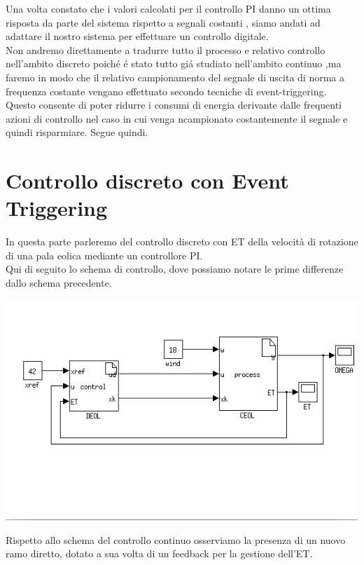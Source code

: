 \documentclass[a4paper,13pt]{article}
\begin{document}
Una volta constato che i valori calcolati per il controllo PI danno un ottima risposta 
da parte del sistema rispetto a segnali costanti , siamo andati ad adattare il nostro sistema per effettuare un controllo digitale.\\
Non andremo direttamente a tradurre tutto il processo e relativo controllo nell'ambito discreto 
poich\'e \'e stato tutto gi\'a studiato nell'ambito continuo ,ma faremo in modo che il relativo campionamento del segnale di uscita di norma a frequenza costante vengano effettuato secondo tecniche di event-triggering.\\
Questo consente di poter ridurre i consumi di energia derivante dalle frequenti azioni di controllo nel caso in cui venga ncampionato costantemente il segnale e quindi risparmiare.
Segue quindi.\\

\section{Controllo discreto con Event Triggering}

	In questa parte parleremo del controllo discreto con ET della velocità di rotazione di una pala eolica mediante un
	controllore PI.\\ Qui di seguito lo schema di controllo, dove possiamo notare le prime differenze dallo schema 				precedente.
	
\begin{center}
\includegraphics[scale=0.6]{eoltrig.png}
\end{center}

	Rispetto allo schema del controllo continuo osserviamo la presenza di un nuovo ramo diretto, dotato a sua volta di un
	feedback per la gestione dell'ET.\\ \\ \\ \\
	
\end{document}
